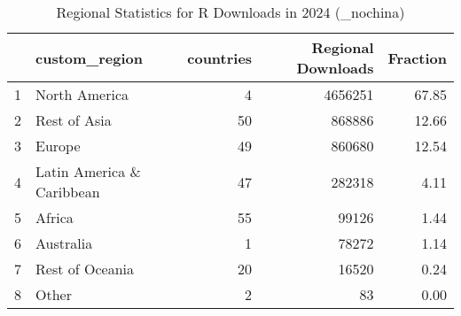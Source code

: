 \begin{table}[ht]
\centering
\begin{tabular}{rlrrr}
  \hline
 & custom\_region & countries & Regional Downloads & Fraction \\ 
  \hline
1 & North America &   4 & 4656251 & 67.85 \\ 
  2 & Rest of Asia &  50 & 868886 & 12.66 \\ 
  3 & Europe &  49 & 860680 & 12.54 \\ 
  4 & Latin America \& Caribbean &  47 & 282318 & 4.11 \\ 
  5 & Africa &  55 & 99126 & 1.44 \\ 
  6 & Australia &   1 & 78272 & 1.14 \\ 
  7 & Rest of Oceania &  20 & 16520 & 0.24 \\ 
  8 & Other &   2 &  83 & 0.00 \\ 
   \hline
\end{tabular}
\caption{Regional Statistics for R Downloads in 2024 (_nochina)} 
\label{tab:r_downloads_regional_stats_2024_nochina}
\end{table}
